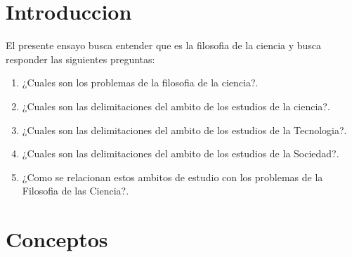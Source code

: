 \maketitle


\tableofcontents

\maketitle



\maketitle

\section{Introduccion}

El presente ensayo busca entender que es la filosofia de la ciencia y busca responder las siguientes preguntas:

\begin{enumerate}
    \item ¿Cuales son los problemas de la filosofia de la ciencia?.
    
    \item ¿Cuales son las delimitaciones del ambito de los estudios de la ciencia?.
    
    \item ¿Cuales son las delimitaciones del ambito de los estudios de la Tecnologia?.
    
    \item ¿Cuales son las delimitaciones del ambito de los estudios de la Sociedad?.
    
    \item ¿Como se relacionan estos ambitos de estudio con los problemas de la Filosofia de las Ciencia?.
    
\end{enumerate}

\section{Conceptos}

